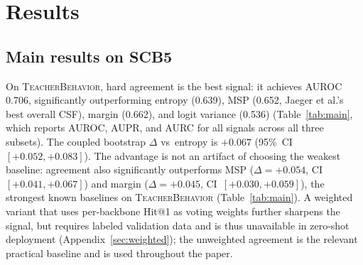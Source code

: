 \documentclass[a4paper,fleqn]{cas-sc}
\newcommand{\tb}{\textsc{TeacherBehavior}}
\newcommand{\scbfive}{\textsc{SCB5}}
\begin{document}
\section{Results}

\subsection{Main results on \scbfive{}}

On \tb{}, hard agreement is the best signal: it achieves AUROC 0.706, significantly outperforming entropy (0.639), MSP (0.652, Jaeger et al.'s best overall CSF), margin (0.662), and logit variance (0.536) (Table~\ref{tab:main}, which reports AUROC, AUPR, and AURC for all signals across all three subsets).
The coupled bootstrap $\Delta$ vs~entropy is $+0.067$ (95\%~CI~$[+0.052,+0.083]$).
The advantage is not an artifact of choosing the weakest baseline: agreement also significantly outperforms MSP ($\Delta = +0.054$, CI~$[+0.041,+0.067]$) and margin ($\Delta = +0.045$, CI~$[+0.030,+0.059]$), the strongest known baselines on \tb{} (Table~\ref{tab:main}).
A weighted variant that uses per-backbone Hit@1 as voting weights further sharpens the signal, but requires labeled validation data and is thus unavailable in zero-shot deployment (Appendix~\ref{sec:weighted}); the unweighted agreement is the relevant practical baseline and is used throughout the paper.
\end{document}
